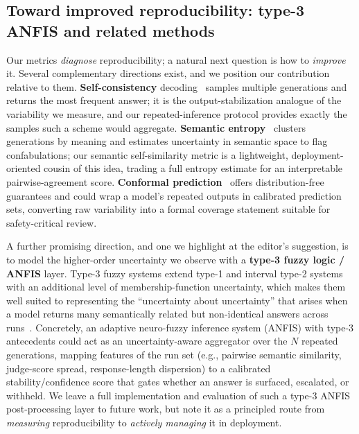 \documentclass[10pt,letterpaper]{article}
\begin{document}
\subsection*{Toward improved reproducibility: type-3 ANFIS and related methods}
\label{sec:improve}

Our metrics \emph{diagnose} reproducibility; a natural next question is
how to \emph{improve} it. Several complementary directions exist, and we
position our contribution relative to them. \textbf{Self-consistency}
decoding~\cite{wang2022selfconsistency, chen2023universal} samples
multiple generations and returns the most frequent answer; it is the
output-stabilization analogue of the variability we measure, and our
repeated-inference protocol provides exactly the samples such a scheme
would aggregate. \textbf{Semantic entropy}~\cite{farquhar2024semantic}
clusters generations by meaning and estimates uncertainty in semantic
space to flag confabulations; our semantic self-similarity metric is a
lightweight, deployment-oriented cousin of this idea, trading a full
entropy estimate for an interpretable pairwise-agreement score.
\textbf{Conformal prediction}~\cite{angelopoulos2021conformal} offers
distribution-free guarantees and could wrap a model's repeated outputs
in calibrated prediction sets, converting raw variability into a
formal coverage statement suitable for safety-critical review.

A further promising direction, and one we highlight at the editor's
suggestion, is to model the higher-order uncertainty we observe with a
\textbf{type-3 fuzzy logic / ANFIS} layer. Type-3 fuzzy
systems extend type-1 and interval type-2 systems with an additional
level of membership-function uncertainty, which makes them well suited
to representing the ``uncertainty about uncertainty'' that arises when a
model returns many semantically related but non-identical answers across
runs~\cite{mohammadzadeh2020type3, cao2021type3}. Concretely, an
adaptive neuro-fuzzy inference system (ANFIS) with type-3 antecedents
could act as an uncertainty-aware aggregator over the $N$ repeated
generations, mapping features of the run set (e.g., pairwise semantic
similarity, judge-score spread, response-length dispersion) to a
calibrated stability/confidence score that gates whether an answer is
surfaced, escalated, or withheld. We leave a full implementation and
evaluation of such a type-3 ANFIS post-processing layer to future work,
but note it as a principled route from \emph{measuring} reproducibility
to \emph{actively managing} it in deployment.
\end{document}
